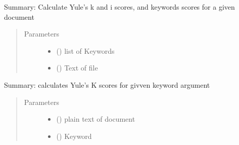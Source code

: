 \documentclass[letterpaper,10pt,english]{sphinxmanual}
\begin{document}
\begin{fulllineitems}
\label{\detokenize{functionsv1:analyze_functions.calculatescores}}
Summary: Calculate Yule’s k and i scores, and keywords scores for a given document
\begin{quote}\begin{description}
\item[{Parameters}] \leavevmode\begin{itemize}
\item {} 
 ({\hyperref[\detokenize{KeywordList:module-KeywordList}]{}}) \textendash{} list of Keywords

\item {} 
 (\sphinxstyleliteralemphasis{{[}}\sphinxstyleliteralemphasis{{]}}) \textendash{} Text of file

\end{itemize}

\end{description}\end{quote}

\end{fulllineitems}


\begin{fulllineitems}
\label{\detokenize{functionsv1:analyze_functions.calculateyulesscore}}
Summary: calculates Yule’s K scores for givven keyword argument
\begin{quote}\begin{description}
\item[{Parameters}] \leavevmode\begin{itemize}
\item {} 
 () \textendash{} plain text of document

\item {} 
 ({\hyperref[\detokenize{Keyword:module-Keyword}]{}}) \textendash{} Keyword

\end{itemize}

\end{description}\end{quote}

\end{fulllineitems}
\end{document}
